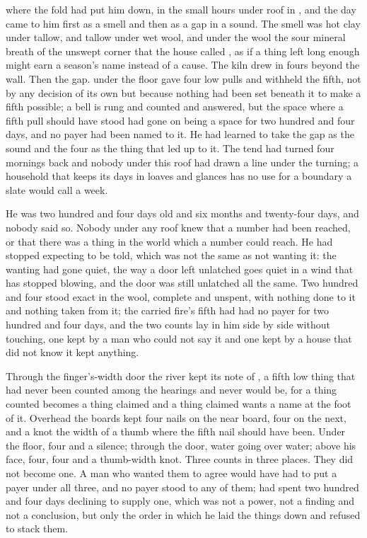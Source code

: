 
 where the fold had put him down, in the small hours under  roof in , and the day came to him first as a smell and then as a gap in a sound. The smell was hot clay under tallow, and tallow under wet wool, and under the wool the sour mineral breath of the unswept corner that the house called , as if a thing left long enough might earn a season's name instead of a cause. The kiln drew in fours beyond the wall. Then the gap.  under the floor gave four low pulls and withheld the fifth, not by any decision of its own but because nothing had been set beneath it to make a fifth possible; a bell is rung and counted and answered, but the space where a fifth pull should have stood had gone on being a space for two hundred and four days, and no payer had been named to it. He had learned to take the gap as the sound and the four as the thing that led up to it. The tend had turned four mornings back and nobody under this roof had drawn a line under the turning; a household that keeps its days in loaves and glances has no use for a boundary a slate would call a week.

He was two hundred and four days old and six months and twenty-four days, and nobody said so. Nobody under any roof knew that a number had been reached, or that there was a thing in the world which a number could reach. He had stopped expecting to be told, which was not the same as not wanting it: the wanting had gone quiet, the way a door left unlatched goes quiet in a wind that has stopped blowing, and the door was still unlatched all the same. Two hundred and four stood exact in the wool, complete and unspent, with nothing done to it and nothing taken from it; the carried fire's fifth had had no payer for two hundred and four days, and the two counts lay in him side by side without touching, one kept by a man who could not say it and one kept by a house that did not know it kept anything.

Through the finger's-width door the river kept its note of , a fifth low thing that had never been counted among the hearings and never would be, for a thing counted becomes a thing claimed and a thing claimed wants a name at the foot of it. Overhead the boards kept four nails on the near board, four on the next, and a knot the width of a thumb where the fifth nail should have been. Under the floor, four and a silence; through the door, water going over water; above his face, four, four and a thumb-width knot. Three counts in three places. They did not become one. A man who wanted them to agree would have had to put a payer under all three, and no payer stood to any of them;  had spent two hundred and four days declining to supply one, which was not a power, not a finding and not a conclusion, but only the order in which he laid the things down and refused to stack them.

